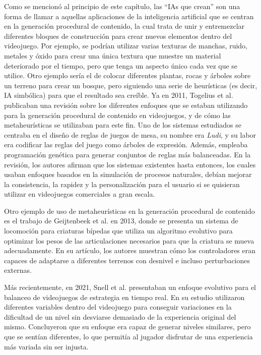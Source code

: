 Como se mencionó al principio de este capítulo, las ``IAs que crean'' son una forma de llamar a aquellas aplicaciones de la inteligencia artificial que se centran en la generación procedural de contenido, la cual trata de unir y entremezclar diferentes bloques de construcción para crear nuevos elementos dentro del videojuego. Por ejemplo, se podrían utilizar varias texturas de manchas, ruido, metales y óxido para crear una única textura que muestre un material deteriorado por el tiempo, pero que tenga un aspecto único cada vez que se utilice. Otro ejemplo sería el de colocar diferentes plantas, rocas y árboles sobre un terreno para crear un bosque, pero siguiendo una serie de heurísticas (es decir, IA simbólica) para que el resultado sea creíble. Ya en 2011, Togelius et al. \cite{togelius_search-based_2011} publicaban una revisión sobre los diferentes enfoques que se estaban utilizando para la generación procedural de contenido en videojuegos, y de cómo las metaheurísticas se utilizaban para este fin. Uno de los sistemas estudiados se centraba en el diseño de reglas de juegos de mesa, su nombre era \textit{Ludi}, y su labor era codificar las reglas del juego como árboles de expresión. Además, empleaba programación genética para generar conjuntos de reglas más balanceadas. En la revisión, los autores afirman que los sistemas existentes hasta entonces, los cuales usaban enfoques basados en la simulación de procesos naturales, debían mejorar la consistencia, la rapidez y la personalización para el usuario si se quisieran utilizar en videojuegos comerciales a gran escala.

Otro ejemplo de uso de metaheurísticas en la generación procedural de contenido es el trabajo de Geijtenbeek et al. \cite{geijtenbeek_flexible_2013} en 2013, donde se presenta un sistema de locomoción para criaturas bípedas que utiliza un algoritmo evolutivo para optimizar los pesos de las articulaciones necesarios para que la criatura se mueva adecuadamente. En su artículo, los autores muestran cómo los controladores eran capaces de adaptarse a diferentes terrenos con desnivel e incluso perturbaciones externas.

Más recientemente, en 2021, Snell et al. \cite{snell_evolutionary_2021} presentaban un enfoque evolutivo para el balanceo de videojuegos de estrategia en tiempo real. En su estudio utilizaron diferentes variables dentro del videojuego para conseguir variaciones en la dificultad de un nivel sin desviarse demasiado de la experiencia original del mismo. Concluyeron que su enfoque era capaz de generar niveles similares, pero que se sentían diferentes, lo que permitía al jugador disfrutar de una experiencia más variada sin ser injusta.

